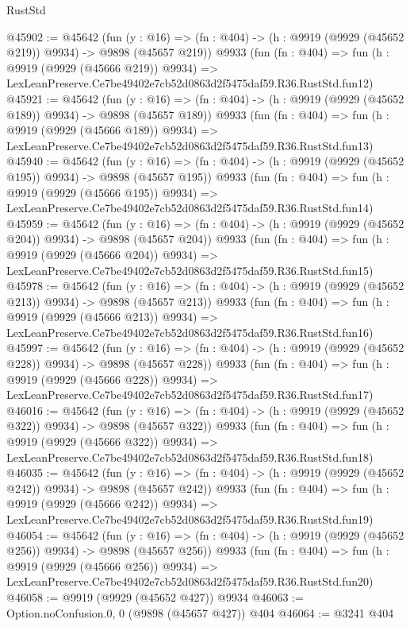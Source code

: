 \begin{lexlean}{RustStd}
\begin{coremodule}
@45902 := @45642
    (fun (y : @16) => (fn : @404) -> (h : @9919 (@9929 (@45652 @219)) @9934) -> @9898 (@45657 @219))
    @9933
    (fun (fn : @404) =>
    fun (h : @9919 (@9929 (@45666 @219)) @9934) =>
    LexLeanPreserve.Ce7be49402e7cb52d0863d2f5475daf59.R36.RustStd.fun12)
@45921 := @45642
    (fun (y : @16) => (fn : @404) -> (h : @9919 (@9929 (@45652 @189)) @9934) -> @9898 (@45657 @189))
    @9933
    (fun (fn : @404) =>
    fun (h : @9919 (@9929 (@45666 @189)) @9934) =>
    LexLeanPreserve.Ce7be49402e7cb52d0863d2f5475daf59.R36.RustStd.fun13)
@45940 := @45642
    (fun (y : @16) => (fn : @404) -> (h : @9919 (@9929 (@45652 @195)) @9934) -> @9898 (@45657 @195))
    @9933
    (fun (fn : @404) =>
    fun (h : @9919 (@9929 (@45666 @195)) @9934) =>
    LexLeanPreserve.Ce7be49402e7cb52d0863d2f5475daf59.R36.RustStd.fun14)
@45959 := @45642
    (fun (y : @16) => (fn : @404) -> (h : @9919 (@9929 (@45652 @204)) @9934) -> @9898 (@45657 @204))
    @9933
    (fun (fn : @404) =>
    fun (h : @9919 (@9929 (@45666 @204)) @9934) =>
    LexLeanPreserve.Ce7be49402e7cb52d0863d2f5475daf59.R36.RustStd.fun15)
@45978 := @45642
    (fun (y : @16) => (fn : @404) -> (h : @9919 (@9929 (@45652 @213)) @9934) -> @9898 (@45657 @213))
    @9933
    (fun (fn : @404) =>
    fun (h : @9919 (@9929 (@45666 @213)) @9934) =>
    LexLeanPreserve.Ce7be49402e7cb52d0863d2f5475daf59.R36.RustStd.fun16)
@45997 := @45642
    (fun (y : @16) => (fn : @404) -> (h : @9919 (@9929 (@45652 @228)) @9934) -> @9898 (@45657 @228))
    @9933
    (fun (fn : @404) =>
    fun (h : @9919 (@9929 (@45666 @228)) @9934) =>
    LexLeanPreserve.Ce7be49402e7cb52d0863d2f5475daf59.R36.RustStd.fun17)
@46016 := @45642
    (fun (y : @16) => (fn : @404) -> (h : @9919 (@9929 (@45652 @322)) @9934) -> @9898 (@45657 @322))
    @9933
    (fun (fn : @404) =>
    fun (h : @9919 (@9929 (@45666 @322)) @9934) =>
    LexLeanPreserve.Ce7be49402e7cb52d0863d2f5475daf59.R36.RustStd.fun18)
@46035 := @45642
    (fun (y : @16) => (fn : @404) -> (h : @9919 (@9929 (@45652 @242)) @9934) -> @9898 (@45657 @242))
    @9933
    (fun (fn : @404) =>
    fun (h : @9919 (@9929 (@45666 @242)) @9934) =>
    LexLeanPreserve.Ce7be49402e7cb52d0863d2f5475daf59.R36.RustStd.fun19)
@46054 := @45642
    (fun (y : @16) => (fn : @404) -> (h : @9919 (@9929 (@45652 @256)) @9934) -> @9898 (@45657 @256))
    @9933
    (fun (fn : @404) =>
    fun (h : @9919 (@9929 (@45666 @256)) @9934) =>
    LexLeanPreserve.Ce7be49402e7cb52d0863d2f5475daf59.R36.RustStd.fun20)
@46058 := @9919 (@9929 (@45652 @427)) @9934
@46063 := Option.noConfusion.{0, 0} (@9898 (@45657 @427)) @404
@46064 := @3241 @404

\end{coremodule}
\end{lexlean}
